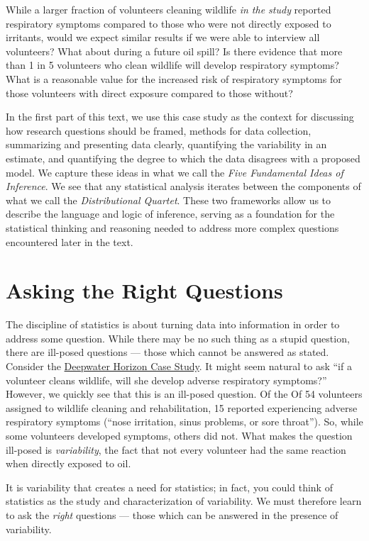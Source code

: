 \documentclass[]{book}
\theoremstyle{definition}
\theoremstyle{definition}
\theoremstyle{definition}
\theoremstyle{remark}
\begin{document}
While a larger fraction of volunteers cleaning wildlife \emph{in the
study} reported respiratory symptoms compared to those who were not
directly exposed to irritants, would we expect similar results if we
were able to interview all volunteers? What about during a future oil
spill? Is there evidence that more than 1 in 5 volunteers who clean
wildlife will develop respiratory symptoms? What is a reasonable value
for the increased risk of respiratory symptoms for those volunteers with
direct exposure compared to those without?

In the first part of this text, we use this case study as the context
for discussing how research questions should be framed, methods for data
collection, summarizing and presenting data clearly, quantifying the
variability in an estimate, and quantifying the degree to which the data
disagrees with a proposed model. We capture these ideas in what we call
the \emph{Five Fundamental Ideas of Inference}. We see that any
statistical analysis iterates between the components of what we call the
\emph{Distributional Quartet}. These two frameworks allow us to describe
the language and logic of inference, serving as a foundation for the
statistical thinking and reasoning needed to address more complex
questions encountered later in the text.

\chapter{Asking the Right Questions}\label{Questions}

The discipline of statistics is about turning data into information in
order to address some question. While there may be no such thing as a
stupid question, there are ill-posed questions --- those which cannot be
answered as stated. Consider the
\protect\hyperlink{CaseDeepwater}{Deepwater Horizon Case Study}. It
might seem natural to ask ``if a volunteer cleans wildlife, will she
develop adverse respiratory symptoms?'' However, we quickly see that
this is an ill-posed question. Of the Of 54 volunteers assigned to
wildlife cleaning and rehabilitation, 15 reported experiencing adverse
respiratory symptoms (``nose irritation, sinus problems, or sore
throat''). So, while some volunteers developed symptoms, others did not.
What makes the question ill-posed is \emph{variability}, the fact that
not every volunteer had the same reaction when directly exposed to oil.

It is variability that creates a need for statistics; in fact, you could
think of statistics as the study and characterization of variability. We
must therefore learn to ask the \emph{right} questions --- those which
can be answered in the presence of variability.
\end{document}
